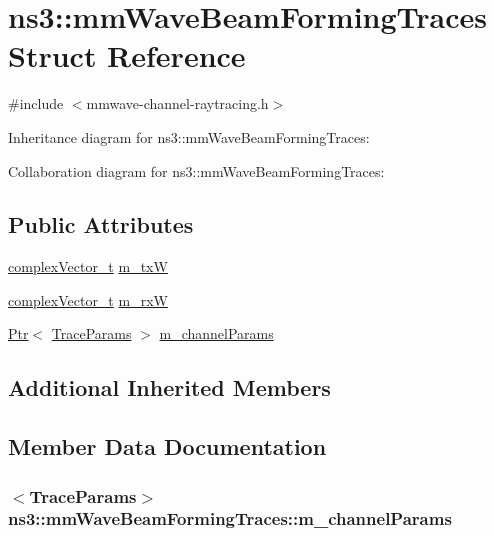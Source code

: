 \hypertarget{structns3_1_1mmWaveBeamFormingTraces}{}\section{ns3\+:\+:mm\+Wave\+Beam\+Forming\+Traces Struct Reference}
\label{structns3_1_1mmWaveBeamFormingTraces}


{\ttfamily \#include $<$mmwave-\/channel-\/raytracing.\+h$>$}



Inheritance diagram for ns3\+:\+:mm\+Wave\+Beam\+Forming\+Traces\+:


Collaboration diagram for ns3\+:\+:mm\+Wave\+Beam\+Forming\+Traces\+:
\subsection*{Public Attributes}
\begin{DoxyCompactItemize}
\item 
\hyperlink{namespacens3_a6a7f75817ae50e6ac47414955b17d926}{complex\+Vector\+\_\+t} \hyperlink{structns3_1_1mmWaveBeamFormingTraces_aff4c963b0b9f9951ee1beef8db31dfbb}{m\+\_\+txW}
\item 
\hyperlink{namespacens3_a6a7f75817ae50e6ac47414955b17d926}{complex\+Vector\+\_\+t} \hyperlink{structns3_1_1mmWaveBeamFormingTraces_ab23555ea0ed255a10c2b88fa31deda67}{m\+\_\+rxW}
\item 
\hyperlink{classns3_1_1Ptr}{Ptr}$<$ \hyperlink{structns3_1_1TraceParams}{Trace\+Params} $>$ \hyperlink{structns3_1_1mmWaveBeamFormingTraces_a221bcac7da4748dd1de319f463202037}{m\+\_\+channel\+Params}
\end{DoxyCompactItemize}
\subsection*{Additional Inherited Members}


\subsection{Member Data Documentation}
\subsubsection[{\texorpdfstring{m\+\_\+channel\+Params}{m_channelParams}}]{$<${\bf Trace\+Params}$>$ ns3\+::mm\+Wave\+Beam\+Forming\+Traces\+::m\+\_\+channel\+Params}\hypertarget{structns3_1_1mmWaveBeamFormingTraces_a221bcac7da4748dd1de319f463202037}{}\label{structns3_1_1mmWaveBeamFormingTraces_a221bcac7da4748dd1de319f463202037}
